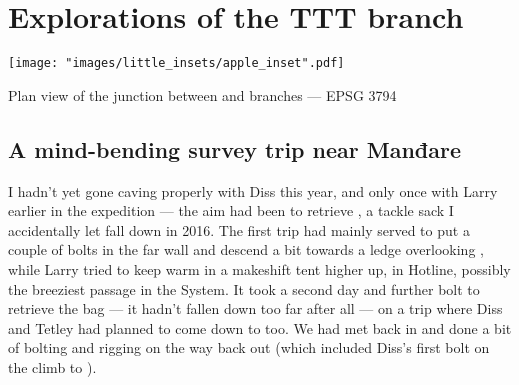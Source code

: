 \section{Explorations of the TTT branch}

\begin{marginfigure}
\end{marginfigure}

\begin{marginsurvey}
	\texttt{[image: "images/little\_insets/apple\_inset".pdf]}
	\caption[Manđare junction]{Plan view of the \protect{} junction between \protect{} and \protect{} branches --- EPSG 3794}
\end{marginsurvey}

\subsection{A mind-bending survey trip near Manđare}
	I hadn't yet gone caving properly with Diss this year, and only once with Larry earlier in the expedition --- the aim had been to retrieve , a tackle sack I accidentally let fall down in 2016. The first trip had mainly served to put a couple of bolts in the far wall and descend a bit towards a ledge overlooking , while Larry tried to keep warm in a makeshift tent higher up, in Hotline, possibly the breeziest passage in the System. It took a second day and further bolt to retrieve the bag --- it hadn't fallen down too far after all --- on a trip where Diss and Tetley had planned to come down to  too. We had met back in  and done a bit of bolting and rigging on the way back out (which included Diss's first bolt on the climb to ).
	
